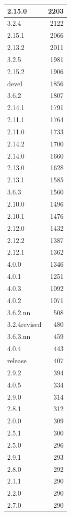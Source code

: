 \documentclass[
]{book}
\begin{document}
\begin{table}
\begin{tabular}[t]{l|r}
\hline
2.15.0 & 2203\\
\hline
3.2.4 & 2122\\
\hline
2.15.1 & 2066\\
\hline
2.13.2 & 2011\\
\hline
3.2.5 & 1981\\
\hline
2.15.2 & 1906\\
\hline
devel & 1856\\
\hline
3.6.2 & 1807\\
\hline
2.14.1 & 1791\\
\hline
2.11.1 & 1764\\
\hline
2.11.0 & 1733\\
\hline
2.14.2 & 1700\\
\hline
2.14.0 & 1660\\
\hline
2.13.0 & 1628\\
\hline
2.13.1 & 1585\\
\hline
3.6.3 & 1560\\
\hline
2.10.0 & 1496\\
\hline
2.10.1 & 1476\\
\hline
2.12.0 & 1432\\
\hline
2.12.2 & 1387\\
\hline
2.12.1 & 1362\\
\hline
4.0.0 & 1346\\
\hline
4.0.1 & 1251\\
\hline
4.0.3 & 1092\\
\hline
4.0.2 & 1071\\
\hline
3.6.2.nn & 508\\
\hline
3.2.4revised & 480\\
\hline
3.6.3.nn & 459\\
\hline
4.0.4 & 443\\
\hline
release & 407\\
\hline
2.9.2 & 394\\
\hline
4.0.5 & 334\\
\hline
2.9.0 & 314\\
\hline
2.8.1 & 312\\
\hline
2.0.0 & 309\\
\hline
2.5.1 & 300\\
\hline
2.5.0 & 296\\
\hline
2.9.1 & 293\\
\hline
2.8.0 & 292\\
\hline
2.1.1 & 290\\
\hline
2.2.0 & 290\\
\hline
2.7.0 & 290\\

\end{tabular}
\end{table}
\end{document}
